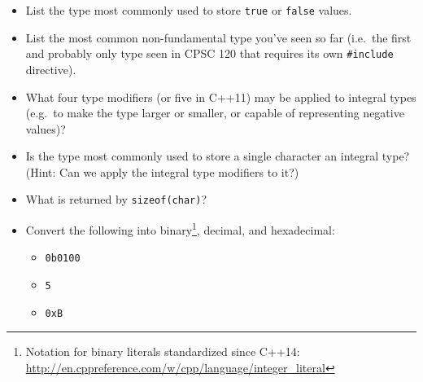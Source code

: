 \begin{itemize}
  \item List the type most commonly used to store \texttt{true} or
    \texttt{false} values.
    \vfill

  \item List the most common non-fundamental type you've seen so far (i.e.~the
    first and probably only type seen in CPSC 120 that requires its own
    \texttt{#include} directive).
    \vfill

  \item What four type modifiers (or five in C++11) may be applied to integral
    types (e.g.~to make the type larger or smaller, or capable of representing
    negative values)?
    \vfill

  \item Is the type most commonly used to store a single character an integral
    type?  (Hint: Can we apply the integral type modifiers to it?)
    \vfill

  \item What is returned by \texttt{sizeof(char)}?
    \vfill

  \item Convert the following into binary\footnote{Notation for binary literals
    standardized since C++14:
    \url{http://en.cppreference.com/w/cpp/language/integer_literal}},
    decimal, and hexadecimal:
    \begin{itemize}

      \item \texttt{0b0100}
        \textQuestion{\vspace{2ex}}

      \item \texttt{5}
        \textQuestion{\vspace{2ex}}

      \item \texttt{0xB}
        \textQuestion{\vspace{2ex}}

    \end{itemize}
    \vspace{1ex}

\end{itemize}



